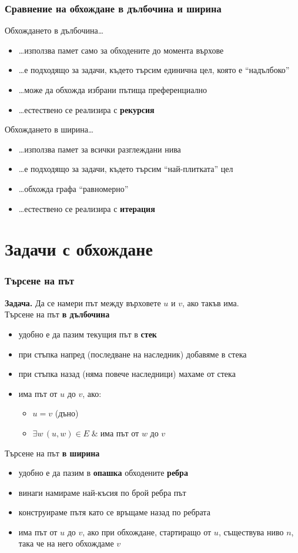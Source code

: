 \documentclass{beamer}
\begin{document}
\begin{frame}
  \frametitle{Сравнение на обхождане в дълбочина и ширина}
  Обхождането в дълбочина\ldots
  \pause
  \begin{itemize}[<+->]
  \item \ldots използва памет само за обходените до момента върхове
  \item \ldots е подходящо за задачи, където търсим единична цел, която е ``надълбоко''
  \item \ldots може да обхожда избрани пътища преференциално
  \item \ldots естествено се реализира с \textbf{рекурсия}
  \end{itemize}
  \onslide<+->
  Обхождането в ширина\ldots
  \begin{itemize}[<+->]
  \item \ldots използва памет за всички разглеждани нива
  \item \ldots е подходящо за задачи, където търсим ``най-плитката'' цел
  \item \ldots обхожда графа ``равномерно''
  \item \ldots естествено се реализира с \textbf{итерация}
  \end{itemize}
\end{frame}

\section{Задачи с обхождане}

\begin{frame}
  \frametitle{Търсене на път}
  \textbf{Задача. } Да се намери път между върховете $u$ и $v$, ако такъв има.\\\pause
  Търсене на път \textbf{в дълбочина}
  \pause
  \begin{itemize}[<+->]
  \item удобно е да пазим текущия път в \textbf{стек}
  \item при стъпка напред (последване на наследник) добавяме в стека
  \item при стъпка назад (няма повече наследници) махаме от стека
  \item има път от $u$ до $v$, ако:
    \begin{itemize}
    \item $u = v$ (дъно)
    \item $\exists w\, (u,w)\in E\;\&\;$има път от $w$ до $v$
    \end{itemize}
  \end{itemize}
  \onslide<+->
  Търсене на път \textbf{в ширина}
  \begin{itemize}[<+->]
  \item удобно е да пазим в \textbf{опашка} обходените \textbf{ребра}
  \item винаги намираме най-късия по брой ребра път
  \item конструираме пътя като се връщаме назад по ребрата
  \item има път от $u$ до $v$, ако при обхождане, стартиращо от $u$, съществува  ниво $n$, така че на него обхождаме $v$
  \end{itemize}
\end{frame}
\end{document}
